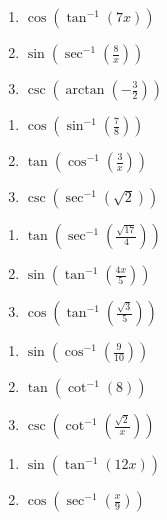 \smallskip
\begin{multicols}{3}
\begin{enumerate}	\setcounter{enumi}{\value{Review}}
	\item $\cos\left(\tan^{-1}(7x)\right)$
	\item $\sin\left(\sec^{-1}\left(\frac{8}{x}\right)\right)$
	\item $\csc\left(\arctan\left(-\frac{3}{2}\right)\right)$
\end{enumerate}	\setcounter{Review}{\value{enumi}}
\end{multicols}
\smallskip
\begin{multicols}{3}
\begin{enumerate}	\setcounter{enumi}{\value{Review}}
	\item $\cos\left(\sin^{-1}\left(\frac{7}{8}\right)\right)$
	\item $\tan\left(\cos^{-1}\left(\frac{3}{x}\right)\right)$
	\item $\csc\left(\sec^{-1}\left(\sqrt{2}\right)\right)$
\end{enumerate}	\setcounter{Review}{\value{enumi}}
\end{multicols}
\smallskip
\begin{multicols}{3}
\begin{enumerate}	\setcounter{enumi}{\value{Review}}
	\item $\tan\left(\sec^{-1}\left(\frac{\sqrt{17}}{4}\right)\right)$
	\item $\sin\left(\tan^{-1}\left(\frac{4x}{5}\right)\right)$
	\item $\cos\left(\tan^{-1}\left(\frac{\sqrt{3}}{5}\right)\right)$
\end{enumerate}	\setcounter{Review}{\value{enumi}}
\end{multicols}
\smallskip
\begin{multicols}{3}
\begin{enumerate}	\setcounter{enumi}{\value{Review}}
	\item $\sin\left(\cos^{-1}\left(\frac{9}{10}\right)\right)$
	\item $\tan\left(\cot^{-1}\left(8\right)\right)$
	\item $\csc\left(\cot^{-1}\left(\frac{\sqrt{2}}{x}\right)\right)$
\end{enumerate}	\setcounter{Review}{\value{enumi}}
\end{multicols}
\smallskip
\begin{multicols}{3}
\begin{enumerate}	\setcounter{enumi}{\value{Review}}
	\item $\sin\left(\tan^{-1}(12x)\right)$
	\item $\cos\left(\sec^{-1}\left(\frac{x}{9}\right)\right)$
\end{enumerate}	\setcounter{Review}{\value{enumi}}
\end{multicols}
\smallskip
\newpage

